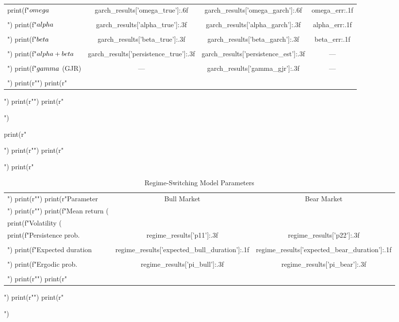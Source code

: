 \documentclass[a4paper, 11pt]{article}
\begin{document}
\begin{pycode}
\begin{table}[htbp]
\begin{tabular}{lccc}
print(f"$\\omega$ & {garch_results['omega_true']:.6f} & {garch_results['omega_garch']:.6f} & {omega_err:.1f} \\\\")
print(f"$\\alpha$ & {garch_results['alpha_true']:.3f} & {garch_results['alpha_garch']:.3f} & {alpha_err:.1f} \\\\")
print(f"$\\beta$ & {garch_results['beta_true']:.3f} & {garch_results['beta_garch']:.3f} & {beta_err:.1f} \\\\")
print(f"$\\alpha + \\beta$ & {garch_results['persistence_true']:.3f} & {garch_results['persistence_est']:.3f} & --- \\\\")
print(f"$\\gamma$ (GJR) & --- & {garch_results['gamma_gjr']:.3f} & --- \\\\")
print(r"\bottomrule")
print(r"\end{tabular}")
print(r"\label{tab:garch}")
print(r"\end{table}")

print(r"\begin{table}[htbp]")
print(r"\centering")
print(r"\caption{Regime-Switching Model Parameters}")
print(r"\begin{tabular}{lcc}")
print(r"\toprule")
print(r"Parameter & Bull Market & Bear Market \\")
print(r"\midrule")
print(f"Mean return (\\%
print(f"Volatility (\\%
print(f"Persistence prob. & {regime_results['p11']:.3f} & {regime_results['p22']:.3f} \\\\")
print(f"Expected duration & {regime_results['expected_bull_duration']:.1f} & {regime_results['expected_bear_duration']:.1f} \\\\")
print(f"Ergodic prob. & {regime_results['pi_bull']:.3f} & {regime_results['pi_bear']:.3f} \\\\")
print(r"\bottomrule")
print(r"\end{tabular}")
print(r"\label{tab:regime}")
print(r"\end{table}")
\end{pycode}
\end{document}
